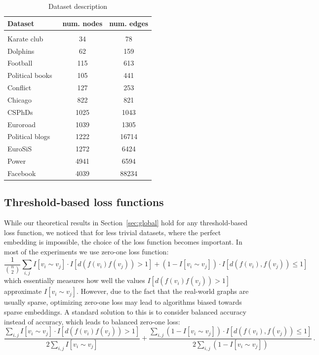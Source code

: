 \documentclass{article} %
\begin{document}
\begin{table}[t]
\caption{Dataset description}
\label{tab:datasets}
\begin{center}
\begin{tabular}{lcc}
Dataset & num. nodes & num. edges \\
 \hline \\
Karate club~\citep{zachary1977information} 
    	& 34 & 78   \\
Dolphins~\citep{lusseau2003bottlenose} & 62 & 159   \\
Football~\citep{newman2004finding} & 115 & 613   \\
Political books~\citep{newman2006modularity} & 105 & 441 \\
Conflict~\citep{ward2007disputes} & 127 & 253 \\
Chicago~\citep{eash1979equilibrium} & 822 & 821 \\
CSPhDs~\citep{nooy2006exploratory} & 1025 & 1043 \\
Euroroad~\citep{vsubelj2011robust} &  1039 & 1305 \\
Political blogs~\citep{adamic2005political} &  1222 &  16714 \\
EuroSiS~\citep{khokhar2015gephi} & 1272 & 6424 \\
Power~\citep{watts1998collective} & 4941 & 6594 \\
Facebook~\citep{leskovec2012learning} & 4039 & 88234 \\
\end{tabular}
\end{center}
\end{table}

\subsection{Threshold-based loss functions}\label{sec:threshold}

While our theoretical results in Section~\ref{sec:global} hold for any threshold-based loss function, we noticed that for less trivial datasets, where the perfect embedding is impossible, the choice of the loss function becomes important. In most of the experiments we use zero-one loss function:
\[
\frac{1}{{n \choose 2}} \sum_{i,j}  I[v_i \sim v_j] \cdot I[d(f(v_i)f(v_j)) > 1] + (1 - I[v_i \sim v_j]) \cdot I[d(f(v_i),f(v_j)) \le 1]
\]
which essentially measures how well the values $I[d(f(v_i)f(v_j)) > 1]$ approximate $I[v_i \sim v_j]$.
However, due to the fact that the real-world graphs are usually sparse, optimizing zero-one loss may lead to algorithms biased towards sparse embeddings. A standard solution to this is to consider balanced accuracy instead of accuracy, which leads to balanced zero-one loss:
\[
\frac{\sum_{i,j}  I[v_i \sim v_j] \cdot I[d(f(v_i)f(v_j)) > 1]}{2 \sum_{i,j}  I[v_i \sim v_j] } + \frac{\sum_{i,j} (1 - I[v_i \sim v_j]) \cdot I[d(f(v_i),f(v_j)) \le 1]}{2 \sum_{i,j} (1 - I[v_i \sim v_j])}\,.
\]
\end{document}
